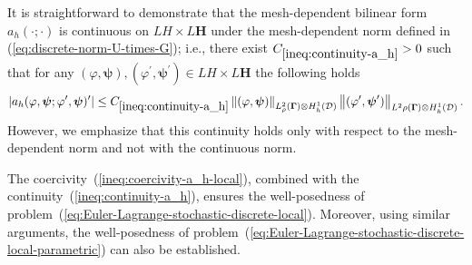 \documentclass[final,onefignum,onetabnum]{mousaviart}
\begin{document}
		\vspace*{1mm}
		\begin{remark}
			It is straightforward to demonstrate that the mesh-dependent bilinear form	$a_h(\cdot; \cdot)$ is continuous on $L H \times L \boldsymbol{H}$
			under the mesh-dependent norm defined in (\ref{eq:discrete-norm-U-times-G}); 
			i.e., there exist $C_{\ref{ineq:continuity-a_h}}> 0$ such that for 
			any $(\varphi, \boldsymbol{\psi}), (\varphi^{\prime}, \boldsymbol{\psi}^{\prime}) \in L H \times L \boldsymbol{H} $ the following holds
			\begin{equation}
				\label{ineq:continuity-a_h}
				\left|  a_h (\varphi, \boldsymbol{\psi}; \varphi^\prime, \boldsymbol{\psi})^\prime \right| 
				\leq
				C_{\ref{ineq:continuity-a_h}}
				\left\|  (\varphi, \boldsymbol{\psi}) \right\|_{L^2_{\rho}(\boldsymbol{\Gamma}) \otimes
					H^1_h(\mathcal{D})   
				}
				\left\|  (\varphi^{\prime}, \boldsymbol{\psi}^\prime) \right\|_{ L^2_{}\rho(\boldsymbol{\Gamma}) \otimes H^1_h(\mathcal{D})  
				}.
			\end{equation}
			However, we emphasize that this continuity holds only with respect to the mesh-dependent norm and not with the continuous norm.
		\end{remark}
		
		\vspace*{1mm}
		\begin{remark}
			The coercivity~(\ref{ineq:coercivity-a_h-local}), combined with the continuity~(\ref{ineq:continuity-a_h}), ensures the well-posedness of problem~(\ref{eq:Euler-Lagrange-stochastic-discrete-local}). Moreover, using similar arguments, the well-posedness of problem~(\ref{eq:Euler-Lagrange-stochastic-discrete-local-parametric}) can also be established.
		\end{remark}
		
\end{document}
